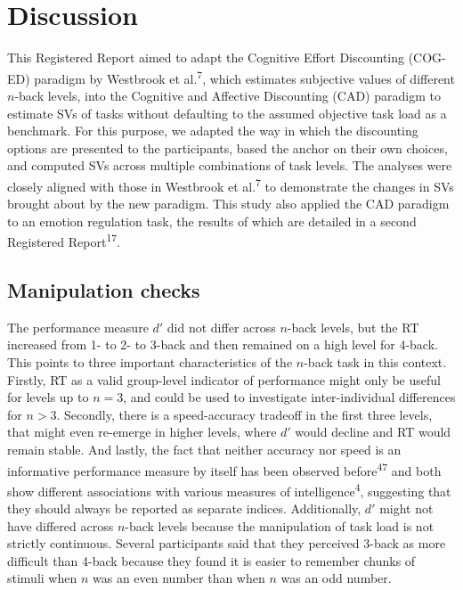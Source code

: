 \documentclass[
  man,floatsintext]{apa6}
\begin{document}
\hypertarget{discussion}{%
\section{Discussion}\label{discussion}}

This Registered Report aimed to adapt the Cognitive Effort Discounting (COG-ED) paradigm by Westbrook et al.\textsuperscript{7}, which estimates subjective values of different \(n\)-back levels, into the Cognitive and Affective Discounting (CAD) paradigm to estimate SVs of tasks without defaulting to the assumed objective task load as a benchmark.
For this purpose, we adapted the way in which the discounting options are presented to the participants, based the anchor on their own choices, and computed SVs across multiple combinations of task levels.
The analyses were closely aligned with those in Westbrook et al.\textsuperscript{7} to demonstrate the changes in SVs brought about by the new paradigm.
This study also applied the CAD paradigm to an emotion regulation task, the results of which are detailed in a second Registered Report\textsuperscript{17}.

\hypertarget{manipulation-checks-1}{%
\subsection{Manipulation checks}\label{manipulation-checks-1}}

The performance measure \(d'\) did not differ across \(n\)-back levels, but the RT increased from 1- to 2- to 3-back and then remained on a high level for 4-back.
This points to three important characteristics of the \(n\)-back task in this context.
Firstly, RT as a valid group-level indicator of performance might only be useful for levels up to \(n=3\), and could be used to investigate inter-individual differences for \(n>3\).
Secondly, there is a speed-accuracy tradeoff in the first three levels, that might even re-emerge in higher levels, where \(d'\) would decline and RT would remain stable.
And lastly, the fact that neither accuracy nor speed is an informative performance measure by itself has been observed before\textsuperscript{47} and both show different associations with various measures of intelligence\textsuperscript{4}, suggesting that they should always be reported as separate indices.
Additionally, \(d'\) might not have differed across \(n\)-back levels because the manipulation of task load is not strictly continuous.
Several participants said that they perceived 3-back as more difficult than 4-back because they found it is easier to remember chunks of stimuli when \(n\) was an even number than when \(n\) was an odd number.
\end{document}
